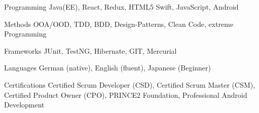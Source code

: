 

\begin{cvskills}

  \cvskill
    {Programming} %
    {Java(EE), React, Redux, HTML5 Swift, JavaScript, Android} %

  \cvskill
    {Methods} %
    {OOA/OOD, TDD, BDD, Design-Patterns, Clean Code, extreme Programming} %

  \cvskill
    {Frameworks} %
    {JUnit, TestNG, Hibernate, GIT, Mercurial} %

  \cvskill
    {Languages} %
    {German (native), English (fluent), Japanese (Beginner)} %

    \cvskill
    {Certifications} %
    {Certified Scrum Developer (CSD), Certified Scrum Master (CSM), Certified Product Owner (CPO), PRINCE2 Foundation, Professional Android Development}

\end{cvskills}
